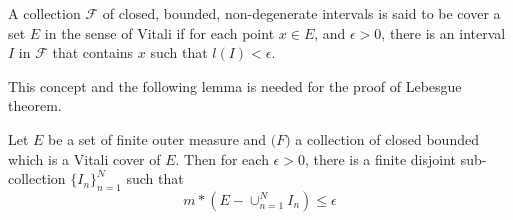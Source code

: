 \documentclass[lang=en, 12pt]{elegantbook}
\begin{document}
        \begin{definition}
            A collection $\mathcal{F}$ of closed, bounded, non-degenerate intervals is said to be cover a set $E$ in the sense of Vitali
        if for each point $x \in E$, and $\epsilon > 0$, there is an interval $I$ in $\mathcal{F}$ that contains $x$ such that 
        $l(I) < \epsilon$.
        \end{definition}
        This concept and the following lemma is needed for the proof of Lebesgue theorem. 
        \begin{lemma}
            Let $E$ be a set of finite outer measure and $\mathcal(F)$ a collection of closed bounded which is a Vitali cover of $E$.
        Then for each $\epsilon > 0$, there is a finite disjoint sub-collection $\{I_n\}_{n=1}^N$ such that 
        $$m*(E - \cup_{n=1}^{N} I_n) \leq \epsilon$$
        \end{lemma}
\end{document}
